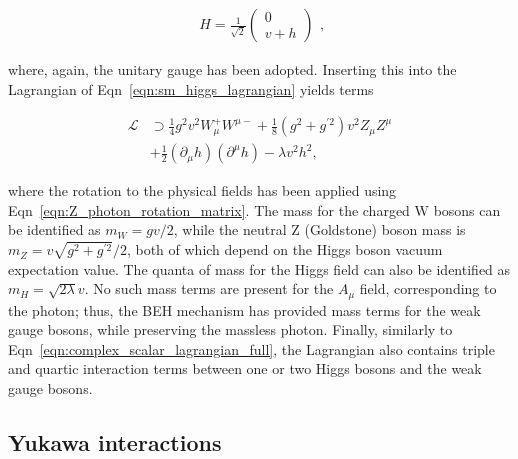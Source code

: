 \begin{equation}
\begin{split}
    H = \frac{1}{\sqrt{2}} 
    \begin{pmatrix}
    0  \\
    v+h
    \end{pmatrix} 
   \end{split},
\end{equation}

\noindent where, again, the unitary gauge has been adopted. Inserting this into the Lagrangian of Eqn~\ref{eqn:sm_higgs_lagrangian} yields terms

\begin{align}
    \mathcal{L} &\supset \frac{1}{4}g^{2}v^{2}W^{+}_{\mu}W^{\mu -} + \frac{1}{8}(g^{2}+g^{'2})v^{2}Z_{\mu}Z^{\mu} \\
    &+ \frac{1}{2}(\partial_{\mu}h)(\partial^{\mu}h) - \lambda v^{2}h^{2},
\end{align}

\noindent where the rotation to the physical fields has been applied using Eqn~\ref{eqn:Z_photon_rotation_matrix}. The mass for the charged $\mathrm{W}$ bosons can be identified as $m_{W} = gv/2$, while the neutral $\mathrm{Z}$ (Goldstone) boson mass is $m_{Z} = v\sqrt{g^{2} + g^{'2}}/2$, both of which depend on the Higgs boson vacuum expectation value. The quanta of mass for the Higgs field can also be identified as $m_{H}=\sqrt{2\lambda}v$. No such mass terms are present for the $A_{\mu}$ field, corresponding to the photon; thus, the BEH mechanism has provided mass terms for the weak gauge bosons, while preserving the massless photon. Finally, similarly to Eqn~\ref{eqn:complex_scalar_lagrangian_full}, the Lagrangian also contains triple and quartic interaction terms between one or two Higgs bosons and the weak gauge bosons.

\subsection{Yukawa interactions}

